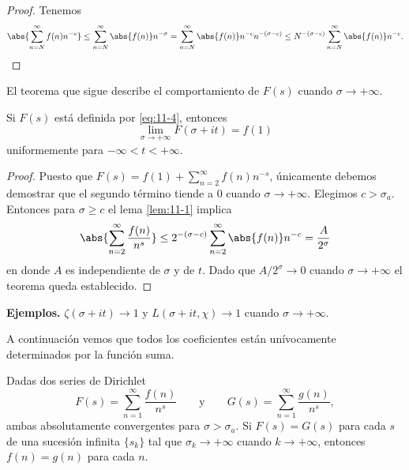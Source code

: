 \documentclass[12pt,a4paper]{book}
\begin{document}
    \begin{proof}
        Tenemos
        \begin{equation*}
            \abs{\sum_{n=N}^{\infty}f(n)n^{-s}}\leq\sum_{n=N}^{\infty}\abs{f(n)}n^{-\sigma}
            =\sum_{n=N}^{\infty}\abs{f(n)}n^{-c}n^{-(\sigma-c)}
            \leq N^{-(\sigma-c)}\sum_{n=N}^{\infty}\abs{f(n)}n^{-c}.\qedhere
        \end{equation*}
    \end{proof}

    El teorema que sigue describe el comportamiento de $F(s)$ cuando $\sigma\to+\infty$.

    \begin{teorema}\label{teo:11-2}
        Si $F(s)$ está definida por \eqref{eq:11-4}, entonces
        \begin{equation*}
            \lim_{\sigma\to+\infty}F(\sigma+it)=f(1)
        \end{equation*}
        uniformemente para $-\infty<t<+\infty$.
    \end{teorema}

    \begin{proof}
        Puesto que $F(s)=f(1)+\sum_{n=2}^{\infty}f(n)n^{-s}$, únicamente debemos demostrar que
        el segundo término tiende a 0 cuando $\sigma\to+\infty$. Elegimos $c>\sigma_{a}$.
        Entonces para $\sigma\geq c$ el lema \ref{lem:11-1} implica
        \begin{equation*}
            \abs{\sum_{n=2}^{\infty}\frac{f(n)}{n^{s}}}\leq2^{-(\sigma-c)}\sum_{n=2}^{\infty}\abs{f(n)}n^{-c}=\frac{A}{2^{\sigma}}
        \end{equation*}
        en donde $A$ es independiente de $\sigma$ y de $t$. Dado que $A/2^{\sigma}\to0$ cuando
        $\sigma\to+\infty$ el teorema queda establecido.
    \end{proof}

    \textbf{Ejemplos.} $\zeta(\sigma+it)\to1$ y $L(\sigma+it,\chi)\to1$ cuando
    $\sigma\to+\infty$.

    A continuación vemos que todos los coeficientes están unívocamente determinados por la
    función suma.

    \begin{teorema}\label{teo:11-3}
        Dadas dos series de Dirichlet
        \begin{equation*}
            F(s)=\sum_{n=1}^{\infty}\frac{f(n)}{n^{s}}\qquad\text{y}\qquad G(s)=\sum_{n=1}^{\infty}\frac{g(n)}{n^{s}},
        \end{equation*}
        ambas absolutamente convergentes para $\sigma>\sigma_{a}$. Si $F(s)=G(s)$ para cada $s$
        de una sucesión infinita $\{s_{k}\}$ tal que $\sigma_{k}\to+\infty$ cuando
        $k\to+\infty$, entonces $f(n)=g(n)$ para cada $n$.
    \end{teorema}
\end{document}
